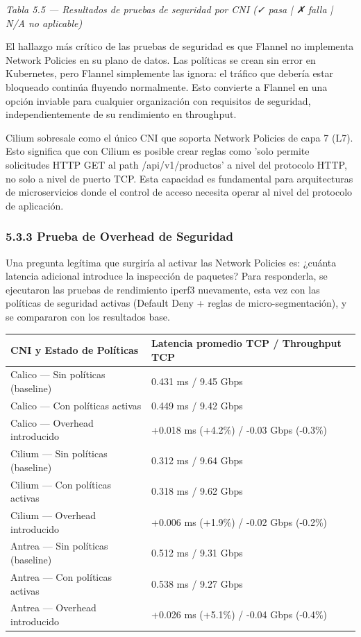 \documentclass[journal]{IEEEtran}
\begin{document}
\begin{center}\emph{\emph{Tabla 5.5 --- Resultados de pruebas de seguridad por CNI (✓ pasa | ✗ falla | N/A no aplicable)}}\end{center}

El hallazgo más crítico de las pruebas de seguridad es que Flannel no implementa Network Policies en su plano de datos. Las políticas se crean sin error en Kubernetes, pero Flannel simplemente las ignora: el tráfico que debería estar bloqueado continúa fluyendo normalmente. Esto convierte a Flannel en una opción inviable para cualquier organización con requisitos de seguridad, independientemente de su rendimiento en throughput.

Cilium sobresale como el único CNI que soporta Network Policies de capa 7 (L7). Esto significa que con Cilium es posible crear reglas como 'solo permite solicitudes HTTP GET al path /api/v1/productos' a nivel del protocolo HTTP, no solo a nivel de puerto TCP. Esta capacidad es fundamental para arquitecturas de microservicios donde el control de acceso necesita operar al nivel del protocolo de aplicación.

\subsubsection{5.3.3 Prueba de Overhead de Seguridad}

Una pregunta legítima que surgiría al activar las Network Policies es: ¿cuánta latencia adicional introduce la inspección de paquetes? Para responderla, se ejecutaron las pruebas de rendimiento iperf3 nuevamente, esta vez con las políticas de seguridad activas (Default Deny + reglas de micro-segmentación), y se compararon con los resultados base.

\begin{table}[htbp]
\centering
\scriptsize
\begin{tabularx}{\textwidth}{|Y|Y|}
\hline
\textbf{CNI y Estado de Políticas} & \textbf{Latencia promedio TCP / Throughput TCP} \\
\hline
Calico --- Sin políticas (baseline) & 0.431 ms / 9.45 Gbps \\
Calico --- Con políticas activas & 0.449 ms / 9.42 Gbps \\
Calico --- Overhead introducido & +0.018 ms (+4.2\%) / -0.03 Gbps (-0.3\%) \\
Cilium --- Sin políticas (baseline) & 0.312 ms / 9.64 Gbps \\
Cilium --- Con políticas activas & 0.318 ms / 9.62 Gbps \\
Cilium --- Overhead introducido & +0.006 ms (+1.9\%) / -0.02 Gbps (-0.2\%) \\
Antrea --- Sin políticas (baseline) & 0.512 ms / 9.31 Gbps \\
Antrea --- Con políticas activas & 0.538 ms / 9.27 Gbps \\
Antrea --- Overhead introducido & +0.026 ms (+5.1\%) / -0.04 Gbps (-0.4\%) \\
\hline
\end{tabularx}
\end{table}
\end{document}
